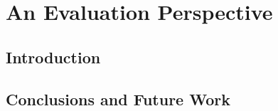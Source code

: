 \chapter{An Evaluation Perspective}\label{ch:evaluation}

\section{Introduction}

\blindtext




\section{Conclusions and Future Work}\label{sec:conc}

\blindtext
